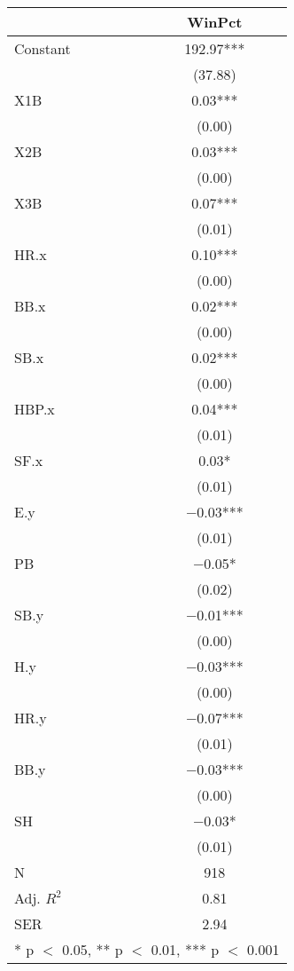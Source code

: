 \begin{table}
\centering
\begin{tabular}[t]{lc}
\toprule
  & WinPct\\
\midrule
Constant & \num{192.97}***\\
 & (\num{37.88})\\
X1B & \num{0.03}***\\
 & \vphantom{7} (\num{0.00})\\
X2B & \num{0.03}***\\
 & \vphantom{6} (\num{0.00})\\
X3B & \num{0.07}***\\
 & \vphantom{5} (\num{0.01})\\
HR.x & \num{0.10}***\\
 & \vphantom{5} (\num{0.00})\\
BB.x & \num{0.02}***\\
 & \vphantom{4} (\num{0.00})\\
SB.x & \num{0.02}***\\
 & \vphantom{3} (\num{0.00})\\
HBP.x & \num{0.04}***\\
 & \vphantom{4} (\num{0.01})\\
SF.x & \num{0.03}*\\
 & \vphantom{3} (\num{0.01})\\
E.y & \num{-0.03}***\\
 & \vphantom{2} (\num{0.01})\\
PB & \num{-0.05}*\\
 & (\num{0.02})\\
SB.y & \num{-0.01}***\\
 & \vphantom{2} (\num{0.00})\\
H.y & \num{-0.03}***\\
 & \vphantom{1} (\num{0.00})\\
HR.y & \num{-0.07}***\\
 & \vphantom{1} (\num{0.01})\\
BB.y & \num{-0.03}***\\
 & (\num{0.00})\\
SH & \num{-0.03}*\\
 & (\num{0.01})\\
\midrule
N & \num{918}\\
Adj. $R^2$ & \num{0.81}\\
SER & \num{2.94}\\
\bottomrule
\multicolumn{2}{l}{\rule{0pt}{1em}* p $<$ 0.05, ** p $<$ 0.01, *** p $<$ 0.001}\\
\end{tabular}
\end{table}
